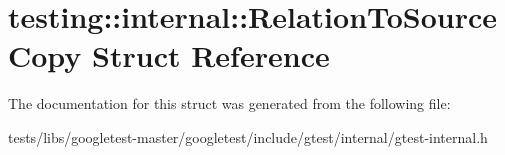 \hypertarget{structtesting_1_1internal_1_1RelationToSourceCopy}{}\section{testing\+:\+:internal\+:\+:Relation\+To\+Source\+Copy Struct Reference}
\label{structtesting_1_1internal_1_1RelationToSourceCopy}


The documentation for this struct was generated from the following file\+:\begin{DoxyCompactItemize}
\item 
tests/libs/googletest-\/master/googletest/include/gtest/internal/gtest-\/internal.\+h\end{DoxyCompactItemize}

